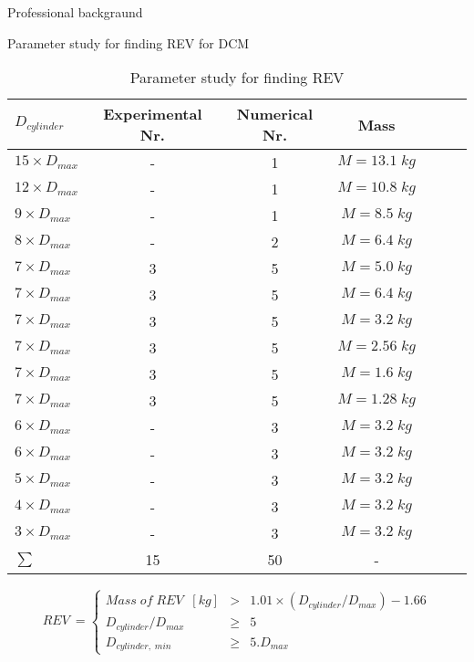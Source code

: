 \documentclass[10pt,xcolor=dvipsnames]{beamer}
\begin{document}
{\begin{frame}{Professional backgraund}
{\begin{frame}{Parameter study for finding REV for DCM}
{\begin{table}[b]
\begin{center}
\begin{tabular}{lcccccc}
$D_{cylinder}$             & Experimental Nr.    & Numerical Nr. & Mass\\\hline
$15\times D_{max}$  & -              & 1           &  $M=13.1\; kg$	\\
$12\times D_{max}$  & -              & 1           &  $M=10.8\; kg$	\\
$9\times D_{max}$  & -              & 1           &  $M=8.5\; kg$	\\
$8\times D_{max}$  & -              & 2           &  $M=6.4\; kg$	\\
$7\times D_{max}$  & 3              & 5           &  $M=5.0\; kg$ \\
$7\times D_{max}$  & 3              & 5           &  $M=6.4\; kg$	\\
$7\times D_{max}$  & 3              & 5           &  $M=3.2\; kg$	\\
$7\times  D_{max}$  & 3              & 5           & $M=2.56\; kg$\\
$7\times  D_{max}$  & 3              & 5           &  $M=1.6\; kg$\\
$7\times  D_{max}$  & 3              & 5           &  $M=1.28\; kg$\\
$6\times D_{max}$ & -              & 3            &  $M=3.2\; kg$	\\
$6\times D_{max}$ & -              & 3            &  $M=3.2\; kg$	\\
$5\times D_{max}$ & -              & 3            &  $M=3.2\; kg$	\\
$4\times D_{max}$ & -              & 3            &  $M=3.2\; kg$	\\
$3\times D_{max}$ & -              & 3            &  $M=3.2\; kg$	\\\hline
 $ \sum $ &  15 & 50 & - \\\hline
\end{tabular}
    \label{tab:Values of Volume Flux}  
    \caption{Parameter study for finding REV}
\end{center}

\end{table}}%
\vspace{-0.7cm}

{\scriptsize
\begin{equation}
\label{eq:Mass_REV}
    REV  \: = \left\{\begin{array}{rcl}
         Mass\;of\; REV \;\; [kg]  & > & 1.01 \times (D_{cylinder}/D_{max}) -1.66\\
              D_{cylinder}/D_{max} & \geqslant  & 5 \\
              D_{cylinder,\; min}& \geqslant  & 5.D_{max}  
\end{array}\right.  %
\end{equation}}
\end{frame}
}



\end{frame}}
\end{document}
